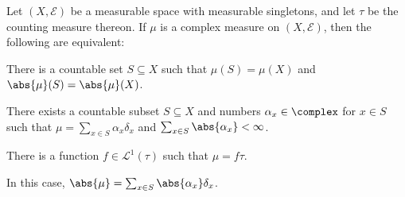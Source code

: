 \documentclass[article, a4paper, 11pt, oneside]{memoir}
\numberwithin{equation}{chapter}
\newcommand{\calE}{\mathcal{E}}
\newcommand{\calL}{\mathcal{L}}
\begin{document}
\begin{proposition}
    Let $(X,\calE)$ be a measurable space with measurable singletons, and let $\tau$ be the counting measure thereon. If $\mu$ is a complex measure on $(X,\calE)$, then the following are equivalent:
    \begin{enumprop}
        \item There is a countable set $S \subseteq X$ such that $\mu(S) = \mu(X)$ and $\abs{\mu}(S) = \abs{\mu}(X)$.
        
        \item There exists a countable subset $S \subseteq X$ and numbers $\alpha_x \in \complex$ for $x \in S$ such that $\mu = \sum_{x \in S} \alpha_x \delta_x$ and $\sum_{x \in S} \abs{\alpha_x} < \infty$.
        
        \item There is a function $f \in \calL^1(\tau)$ such that $\mu = f \tau$.
    \end{enumprop}
    In this case, $\abs{\mu} = \sum_{x \in S} \abs{\alpha_x} \delta_x$.
\end{proposition}
\end{document}
